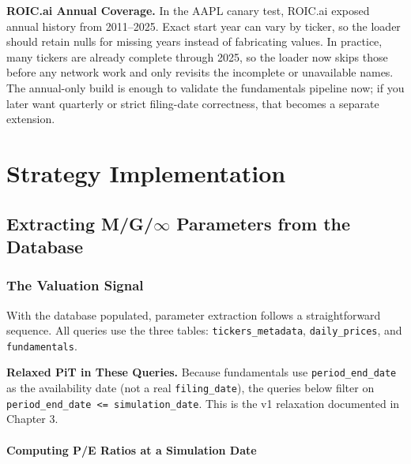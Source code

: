 \documentclass[11pt, oneside]{book}
\begin{document}
\begin{warningbox}
\textbf{ROIC.ai Annual Coverage.} In the AAPL canary test, ROIC.ai exposed annual history from 2011--2025. Exact start year can vary by ticker, so the loader should retain nulls for missing years instead of fabricating values. In practice, many tickers are already complete through 2025, so the loader now skips those before any network work and only revisits the incomplete or unavailable names. The annual-only build is enough to validate the fundamentals pipeline now; if you later want quarterly or strict filing-date correctness, that becomes a separate extension.
\end{warningbox}

\part{Strategy Implementation}

\chapter{Extracting M/G/$\infty$ Parameters from the Database}

\section{The Valuation Signal}

With the database populated, parameter extraction follows a straightforward sequence. All queries use the three tables: \texttt{tickers\_metadata}, \texttt{daily\_prices}, and \texttt{fundamentals}.

\begin{warningbox}
\textbf{Relaxed PiT in These Queries.} Because fundamentals use \texttt{period\_end\_date} as the availability date (not a real \texttt{filing\_date}), the queries below filter on \texttt{period\_end\_date <= simulation\_date}. This is the v1 relaxation documented in Chapter 3.
\end{warningbox}

\subsection{Computing P/E Ratios at a Simulation Date}
\end{document}
